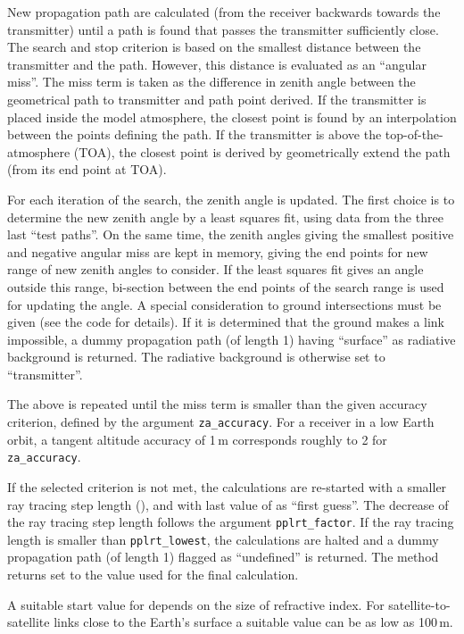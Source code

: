 New propagation path are calculated (from the receiver backwards towards the
transmitter) until a path is found that passes the transmitter sufficiently
close. The search and stop criterion is based on the smallest distance between
the transmitter and the path. However, this distance is evaluated as an
``angular miss''. The miss term is taken as the difference in zenith angle
between the geometrical path to transmitter and path point derived. If the
transmitter is placed inside the model atmosphere, the closest point is found
by an interpolation between the points defining the path. If the transmitter is
above the top-of-the-atmosphere (TOA), the closest point is derived by
geometrically extend the path (from its end point at TOA).

For each iteration of the search, the zenith angle is updated. The first choice
is to determine the new zenith angle by a least squares fit, using data from
the three last ``test paths''. On the same time, the zenith angles giving the
smallest positive and negative angular miss are kept in memory, giving the end
points for new range of new zenith angles to consider. If the least squares fit
gives an angle outside this range, bi-section between the end points of the
search range is used for updating the angle. A special consideration to ground
intersections must be given (see the code for details). If it is determined
that the ground makes a link impossible, a dummy propagation path (of length 1)
having ``surface'' as radiative background is returned. The radiative
background is otherwise set to ``transmitter''.

The above is repeated until the miss term is smaller than the given accuracy
criterion, defined by the argument \texttt{za\_accuracy}. For a receiver in a
low Earth orbit, a tangent altitude accuracy of 1\,m corresponds roughly to 
2 for \texttt{za\_accuracy}.

If the selected criterion is not met, the calculations are re-started with a
smaller ray tracing step length (), and with last
value of  as ``first guess''. The decrease of the ray
tracing step length follows the argument \texttt{pplrt\_factor}. If the ray
tracing length is smaller than \texttt{pplrt\_lowest}, the calculations are
halted and a dummy propagation path (of length 1) flagged as ``undefined'' is
returned. The method returns  set to the value
used for the final calculation.

A suitable start value for  depends on the size of
refractive index. For satellite-to-satellite links close to the
Earth's surface a suitable value can be as low as 100\,m.


